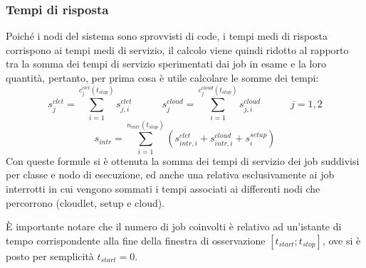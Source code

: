 \subsubsection{Tempi di risposta}
Poiché i nodi del sistema sono sprovvisti di code, i tempi medi di risposta
corrispono ai tempi medi di servizio, il calcolo viene quindi ridotto al
rapporto tra la somma dei tempi di servizio sperimentati dai job in esame e la
loro quantità, pertanto, per prima cosa è utile calcolare le somme dei
tempi:
\begin{displaymath}
s_j^{clet} = \displaystyle \sum_{i=1}^{c_j^{clet}(t_{stop})} s_{j,i}^{clet} 
\qquad\quad
s_j^{cloud} = \displaystyle \sum_{i=1}^{c_j^{cloud}(t_{stop})} s_{j,i}^{cloud}
\qquad \quad j = 1, 2 
\end{displaymath}
\begin{displaymath}
s_{intr} = \sum_{i=1}^{n_{intr}(t_{stop})} (s_{intr,i}^{clet} +
s_{intr,i}^{cloud} + s_i^{setup})
\end{displaymath}
%
Con queste formule si è ottenuta la somma dei tempi di servizio dei job
suddivisi per classe e nodo di esecuzione, ed anche una relativa esclusivamente
ai job interrotti in cui vengono sommati i tempi associati ai differenti nodi
che percorrono (cloudlet, setup e cloud).

È importante notare che il numero di job coinvolti è relativo ad un'istante di
tempo corrispondente alla fine della finestra di osservazione $[t_{start};
t_{stop}]$, ove si è posto per semplicità $t_{start}=0$.

